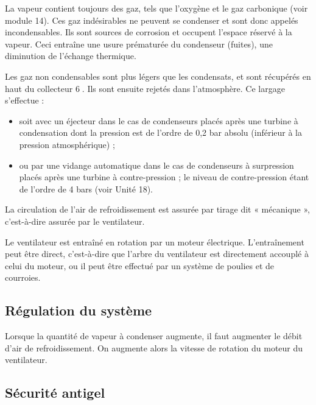 \vspace{0.3cm}

La vapeur contient toujours des gaz, tels que l’oxygène et le gaz carbonique (voir module 14). Ces gaz indésirables ne peuvent se condenser et sont donc appelés incondensables. Ils sont sources de corrosion et occupent l’espace réservé à la vapeur. Ceci entraîne une usure prématurée du condenseur (fuites), une diminution de l’échange thermique.

\vspace{0.3cm}

Les gaz non condensables sont plus légers que les condensats, et sont récupérés en haut du collecteur \textcircled{6}. Ils sont ensuite rejetés dans l'atmosphère. Ce largage s'effectue :
\begin{itemize}

\item soit avec un éjecteur dans le cas de condenseurs placés après une turbine à condensation dont la pression est de l'ordre de 0,2 bar absolu (inférieur à la pression atmosphérique) ;
\item ou par une vidange automatique dans le cas de condenseurs à surpression placés après une turbine à contre-pression ; le niveau de contre-pression étant de l'ordre de 4 bars (voir Unité 18).
\end{itemize}

La circulation de l’air de refroidissement est assurée par tirage dit « mécanique », c’est-à-dire assurée par le ventilateur.
\vspace{0.3cm}

Le ventilateur est entraîné en rotation par un moteur électrique. L’entraînement peut être direct, c’est-à-dire que l’arbre du ventilateur est directement accouplé à celui du moteur, ou il peut être effectué par un système de poulies et de courroies.



\subsection{Régulation du système}

Lorsque la quantité de vapeur à condenser augmente, il faut augmenter le débit d’air de refroidissement. On augmente alors la vitesse de rotation du moteur du ventilateur.


\subsection{Sécurité antigel}


